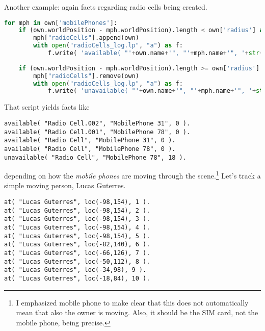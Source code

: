 \documentclass[11pt,a4paper]{article}
\begin{document}
Another example: again facts regarding radio cells being created.
\begin{lstlisting}[language = Python, breaklines=true, caption={Log-file radio cell}]
for mph in own['mobilePhones']:
    if (own.worldPosition - mph.worldPosition).length < own['radius'] and not own in mph["radioCells"]:
        mph["radioCells"].append(own)
        with open("radioCells_log.lp", "a") as f:
            f.write( 'available( "'+own.name+'", "'+mph.name+'", '+str(intTime)+' ).')
        
    if (own.worldPosition - mph.worldPosition).length >= own['radius'] and own in mph["radioCells"]:
        mph["radioCells"].remove(own)
        with open("radioCells_log.lp", "a") as f:
            f.write( 'unavailable( "'+own.name+'", "'+mph.name+'", '+str(intTime)+' ).')
\end{lstlisting}
That script yields facts like
\begin{lstlisting}
available( "Radio Cell.002", "MobilePhone 31", 0 ).
available( "Radio Cell.001", "MobilePhone 78", 0 ).
available( "Radio Cell", "MobilePhone 31", 0 ).
available( "Radio Cell", "MobilePhone 78", 0 ).
unavailable( "Radio Cell", "MobilePhone 78", 18 ).
\end{lstlisting}
depending on how the \textit{mobile phones} are moving through the scene.\footnote{I emphasized mobile phone to make clear that this does not automatically mean that also the owner is moving. Also, it should be the SIM card, not the mobile phone, being precise.} 
Let's track a simple moving person, Lucas Guterres.

\begin{lstlisting}
at( "Lucas Guterres", loc(-98,154), 1 ).
at( "Lucas Guterres", loc(-98,154), 2 ).
at( "Lucas Guterres", loc(-98,154), 3 ).
at( "Lucas Guterres", loc(-98,154), 4 ).
at( "Lucas Guterres", loc(-98,154), 5 ).
at( "Lucas Guterres", loc(-82,140), 6 ).
at( "Lucas Guterres", loc(-66,126), 7 ).
at( "Lucas Guterres", loc(-50,112), 8 ).
at( "Lucas Guterres", loc(-34,98), 9 ).
at( "Lucas Guterres", loc(-18,84), 10 ).
\end{lstlisting}
\end{document}
